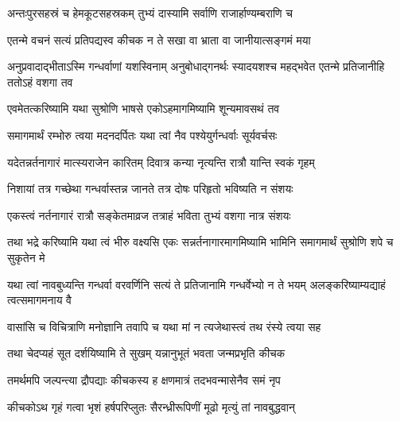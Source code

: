 \twolineshloka
{अन्तःपुरसहस्रं च हेमकूटसहस्रकम्}
{तुभ्यं दास्यामि सर्वाणि राजार्हाण्यम्बराणि च}




\twolineshloka
{एतन्मे वचनं सत्यं प्रतिपद्यस्व कीचक}
{न ते सखा वा भ्राता वा जानीयात्सङ्गमं मया}


\threelineshloka
{अनुप्रवादाद्भीताऽस्मि गन्धर्वाणां यशस्विनाम्}
{अनुबोधाद्गनर्थः स्यादयशश्च महद्भवेत}
{एतन्मे प्रतिजानीहि ततोऽहं वशगा तव}




\twolineshloka
{एवमेतत्करिष्यामि यथा सुश्रोणि भाषसे}
{एकोऽहमागमिष्यामि शून्यमावसथं तव}


\twolineshloka
{समागमार्थं रम्भोरु त्वया मदनदर्पितः}
{यथा त्वां नैव पश्येयुर्गन्धर्वाः सूर्यवर्चसः}




\twolineshloka
{यदेतन्नर्तनागारं मात्स्यराजेन कारितम्}
{दिवात्र कन्या नृत्यन्ति रात्रौ यान्ति स्वकं गृहम्}


\twolineshloka
{निशायां तत्र गच्छेथा गन्धर्वास्तन्न जानते}
{तत्र दोषः परिहृतो भविष्यति न संशयः}


\twolineshloka
{एकस्त्वं नर्तनागारं रात्रौ सङ्केतमाव्रज}
{तत्राहं भविता तुभ्यं वशगा नात्र संशयः}




\threelineshloka
{तथा भद्रे करिष्यामि यथा त्वं भीरु वक्ष्यसि}
{एकः सन्नर्तनागारमागमिष्यामि भामिनि}
{समागमार्थं सुश्रोणि शपे च सुकृतेन मे}


\threelineshloka
{यथा त्वां नावबुध्यन्ति गन्धर्वा वरवर्णिनि}
{सत्यं ते प्रतिजानामि गन्धर्वेभ्यो न ते भयम्}
{अलङ्करिष्याम्यद्याहं त्वत्समागमनाय वै}


\twolineshloka
{वासांसि च विचित्राणि मनोज्ञानि तवापि च}
{यथा मां न त्यजेथास्त्वं तथ रंस्ये त्वया सह}




\twolineshloka
{तथा चेदप्यहं सूत दर्शयिष्यामि ते सुखम्}
{यन्नानुभूतं भवता जन्मप्रभृति कीचक}



\twolineshloka
{तमर्थमपि जल्पन्त्या द्रौपद्याः कीचकस्य ह}
{क्षणमात्रं तदभवन्मासेनैव समं नृप}


\twolineshloka
{कीचकोऽथ गृहं गत्वा भृशं हर्षपरिप्लुतः}
{सैरन्ध्रीरूपिणीं मूढो मृत्युं तां नावबुद्धवान्}


